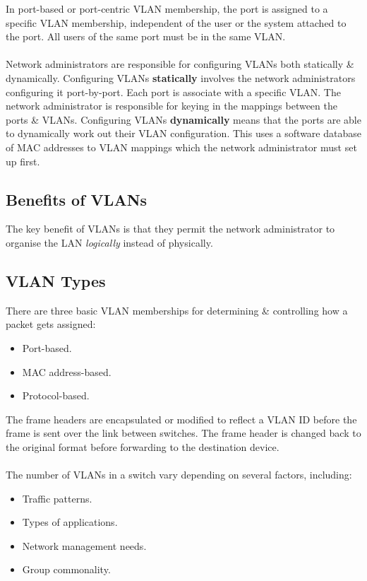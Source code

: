 \documentclass[a4paper,11pt]{article}
\begin{document}
In port-based or port-centric VLAN membership, the port is assigned to a specific VLAN membership, independent of the user 
or the system attached to the port. 
All users of the same port must be in the same VLAN.
\\\\ 
Network administrators are responsible for configuring VLANs both statically \& dynamically. 
Configuring VLANs \textbf{statically} involves the network administrators configuring it port-by-port. 
Each port is associate with a specific VLAN. 
The network administrator is responsible for keying in the mappings between the ports \& VLANs. 
Configuring VLANs \textbf{dynamically} means that the ports are able to dynamically work out their VLAN configuration. 
This uses a software database of MAC addresses to VLAN mappings which the network administrator must set up first.

\subsection{Benefits of VLANs}
The key benefit of VLANs is that they permit the network administrator to organise the LAN \emph{logically} instead of 
physically. 

\subsection{VLAN Types}
There are three basic VLAN memberships for determining \& controlling how a packet gets assigned:
\begin{itemize}
    \item   Port-based. 
    \item   MAC address-based.
    \item   Protocol-based.
\end{itemize}

The frame headers are encapsulated or modified to reflect a VLAN ID before the frame is sent over the link between switches. 
The frame header is changed back to the original format before forwarding to the destination device.
\\\\ 
The number of VLANs in a switch vary depending on several factors, including:
\begin{itemize}
    \item   Traffic patterns. 
    \item   Types of applications. 
    \item   Network management needs. 
    \item   Group commonality.
\end{itemize}
\end{document}
